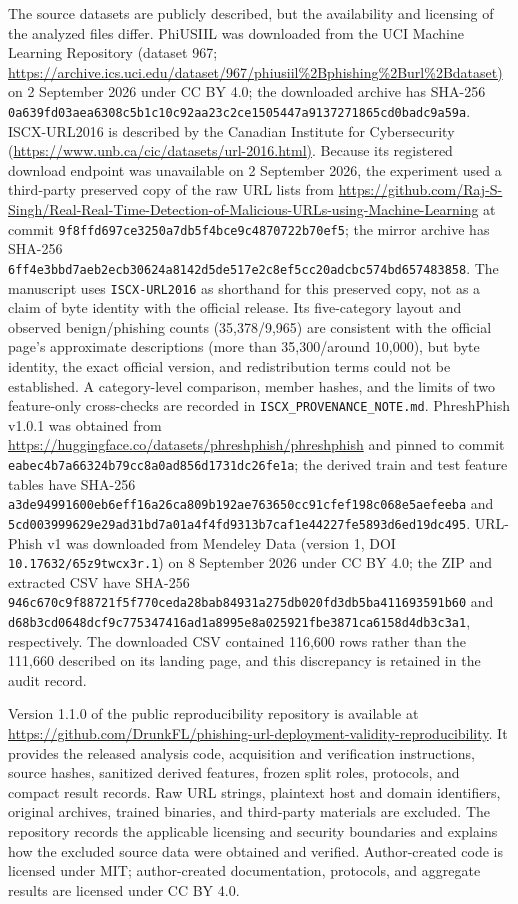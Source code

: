 \documentclass[
  10pt,
]{article}
\begin{document}
The source datasets are publicly described, but the availability and
licensing of the analyzed files differ. PhiUSIIL was downloaded from the
UCI Machine Learning Repository (dataset 967;
\url{https://archive.ics.uci.edu/dataset/967/phiusiil\%2Bphishing\%2Burl\%2Bdataset)}
on 2 September 2026 under CC BY 4.0; the downloaded archive has SHA-256
\nolinkurl{0a639fd03aea6308c5b1c10c92aa23c2ce1505447a9137271865cd0badc9a59a}.
ISCX-URL2016 is described by the Canadian Institute for Cybersecurity
(\url{https://www.unb.ca/cic/datasets/url-2016.html)}. Because its registered
download endpoint was unavailable on 2 September 2026, the experiment
used a third-party preserved copy of the raw URL lists from
\url{https://github.com/Raj-S-Singh/Real-Real-Time-Detection-of-Malicious-URLs-using-Machine-Learning}
at commit \nolinkurl{9f8ffd697ce3250a7db5f4bce9c4870722b70ef5}; the mirror
archive has SHA-256
\nolinkurl{6ff4e3bbd7aeb2ecb30624a8142d5de517e2c8ef5cc20adcbc574bd657483858}.
The manuscript uses \texttt{ISCX-URL2016} as shorthand for this
preserved copy, not as a claim of byte identity with the official
release. Its five-category layout and observed benign/phishing counts
(35,378/9,965) are consistent with the official page's approximate
descriptions (more than 35,300/around 10,000), but byte identity, the
exact official version, and redistribution terms could not be
established. A category-level comparison, member hashes, and the limits
of two feature-only cross-checks are recorded in
\texttt{ISCX\_PROVENANCE\_NOTE.md}. PhreshPhish v1.0.1 was obtained from
\url{https://huggingface.co/datasets/phreshphish/phreshphish} and pinned to
commit \nolinkurl{eabec4b7a66324b79cc8a0ad856d1731dc26fe1a}; the derived
train and test feature tables have SHA-256
\nolinkurl{a3de94991600eb6eff16a26ca809b192ae763650cc91cfef198c068e5aefeeba}
and
\nolinkurl{5cd003999629e29ad31bd7a01a4f4fd9313b7caf1e44227fe5893d6ed19dc495}.
URL-Phish v1 was downloaded from Mendeley Data (version 1, DOI
\texttt{10.17632/65z9twcx3r.1}) on 8 September 2026 under CC BY 4.0; the
ZIP and extracted CSV have SHA-256
\nolinkurl{946c670c9f88721f5f770ceda28bab84931a275db020fd3db5ba411693591b60}
and
\nolinkurl{d68b3cd0648dcf9c775347416ad1a8995e8a025921fbe3871ca6158d4db3c3a1},
respectively. The downloaded CSV contained 116,600 rows rather than the
111,660 described on its landing page, and this discrepancy is retained
in the audit record.

Version 1.1.0 of the public reproducibility repository is available at
\url{https://github.com/DrunkFL/phishing-url-deployment-validity-reproducibility}.
It provides the released analysis code, acquisition and verification
instructions, source hashes, sanitized derived features, frozen split
roles, protocols, and compact result records. Raw URL strings, plaintext
host and domain identifiers, original archives, trained binaries, and
third-party materials are excluded. The repository records the
applicable licensing and security boundaries and explains how the
excluded source data were obtained and verified. Author-created code is
licensed under MIT; author-created documentation, protocols, and
aggregate results are licensed under CC BY 4.0.
\end{document}

